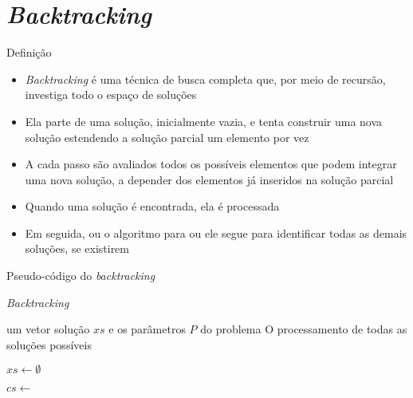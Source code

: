 \section{\it Backtracking}

\begin{frame}[fragile]{Definição}

    \begin{itemize}
        \item \textit{Backtracking} é uma técnica de busca completa que, por meio de recursão,
            investiga todo o espaço de soluções

        \item Ela parte de uma solução, inicialmente vazia, e tenta construir uma nova solução
            estendendo a solução parcial um elemento por vez

        \item A cada passo são avaliados todos os possíveis elementos que podem integrar
            uma nova solução, a depender dos elementos já inseridos na solução parcial

        \item Quando uma solução é encontrada, ela é processada

        \item Em seguida, ou o algoritmo para ou ele segue para identificar todas as demais soluções, se existirem

    \end{itemize}

\end{frame}

\begin{frame}[fragile]{Pseudo-código do {\it backtracking}}

    \begin{algorithm}[H]
        \small

        \caption{\it Backtracking}

        \begin{algorithmic}[1]
            \Require um vetor solução $xs$ e os parâmetros $P$ do problema
            \Ensure O processamento de todas as soluções possíveis

            \State $xs \gets \emptyset$
            \State 
 
                    \State {}
                \Else
                    \State $cs \gets $ 

                        \State {}
                        \State {}
                        \State {}
                        \State {}
                        \State {}
                    \EndFor
                \EndIf
            \EndFunction
        \end{algorithmic}
    \end{algorithm}

\end{frame}

